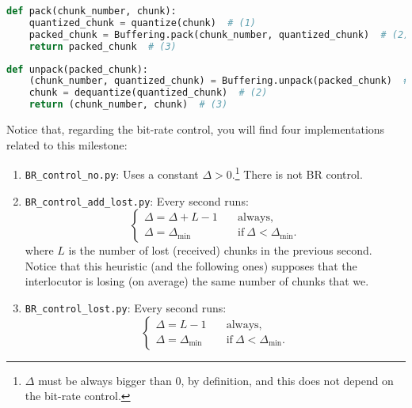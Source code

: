 \begin{lstlisting}[language=Python]
  def pack(chunk_number, chunk):
    quantized_chunk = quantize(chunk)  # (1)
    packed_chunk = Buffering.pack(chunk_number, quantized_chunk)  # (2)
    return packed_chunk  # (3)
\end{lstlisting}

\begin{lstlisting}[language=Python]
  def unpack(packed_chunk):
    (chunk_number, quantized_chunk) = Buffering.unpack(packed_chunk)  # (1)
    chunk = dequantize(quantized_chunk)  # (2)
    return (chunk_number, chunk)  # (3)
\end{lstlisting}

Notice that, regarding the bit-rate control, you will find four
implementations related to this milestone:
\begin{enumerate}
\item \verb|BR_control_no.py|: Uses a constant
  $\Delta>0$.\footnote{$\Delta$ must be always bigger than $0$, by
definition, and this does not depend on the bit-rate control.} There
  is not BR control.
\item \verb|BR_control_add_lost.py|: Every second runs:
  \begin{equation}
    \left\{
    \begin{array}{ll}
      \Delta = \Delta + L - 1 & \quad\text{always}, \\
      \Delta = \Delta_{\text{min}} & \quad\text{if}~\Delta < \Delta_{\text{min}}.                                 
    \end{array}
    \right.
  \end{equation}
  where $L$ is the number of lost (received) chunks in the previous
  second. Notice that this heuristic (and the following ones) supposes
  that the interlocutor is losing (on average) the same number of
  chunks that we.
\item \verb|BR_control_lost.py|: Every second runs:
  \begin{equation}
    \left\{
    \begin{array}{ll}
      \Delta = L - 1 & \quad\text{always}, \\
      \Delta = \Delta_{\text{min}} & \quad\text{if}~\Delta < \Delta_{\text{min}}.
    \end{array}
    \right.
  \end{equation}

\end{enumerate}
